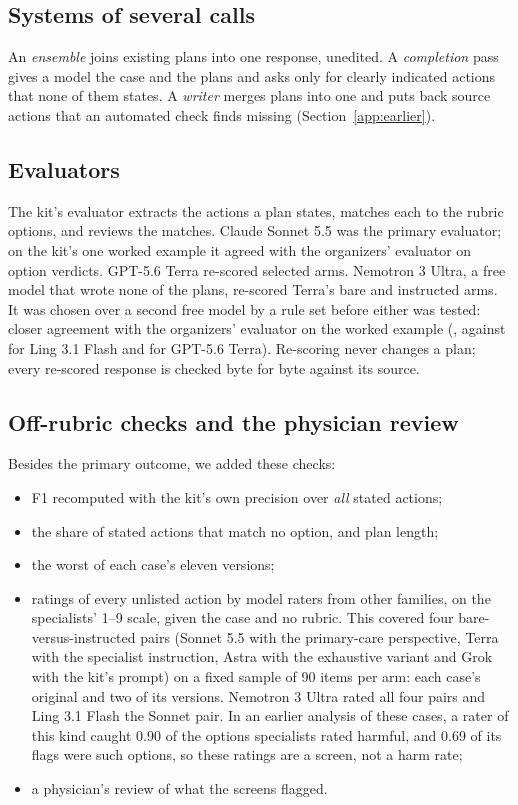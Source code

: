 \documentclass[11pt]{article}
\begin{document}
\subsection{Systems of several calls}
\label{supp:systems}
An \emph{ensemble} joins existing plans into one response, unedited. A \emph{completion} pass gives a
model the case and the plans and asks only for clearly indicated actions that none of them states. A
\emph{writer} merges plans into one and puts back source actions that an automated check finds
missing (Section~\ref{app:earlier}).

\subsection{Evaluators}
\label{supp:evaluators}
The kit's evaluator extracts the actions a plan states, matches each to the rubric options, and
reviews the matches. Claude Sonnet 5.5 was the primary evaluator; on the kit's one worked example it
agreed with the organizers' evaluator on \judgeAgreeSonnet{} option verdicts. GPT-5.6 Terra
re-scored selected arms. Nemotron 3 Ultra, a free model that wrote none of the plans, re-scored
Terra's bare and instructed arms. It was chosen over a second free model by a rule set before either
was tested: closer agreement with the organizers' evaluator on the worked example
(\judgeAgreeNemotron{}, against \judgeAgreeLing{} for Ling 3.1 Flash and \judgeAgreeTerra{} for
GPT-5.6 Terra). Re-scoring never changes a plan; every re-scored response is checked byte for byte
against its source.

\subsection{Off-rubric checks and the physician review}
\label{supp:review}
Besides the primary outcome, we added these checks:
\begin{itemize}
\item F1 recomputed with the kit's own precision over \emph{all} stated actions;
\item the share of stated actions that match no option, and plan length;
\item the worst of each case's eleven versions;
\item ratings of every unlisted action by model raters from other families, on the specialists' 1--9
scale, given the case and no rubric. This covered four bare-versus-instructed pairs (Sonnet 5.5 with
the primary-care perspective, Terra with the specialist instruction, Astra with the exhaustive
variant and Grok with the kit's prompt) on a fixed sample of 90 items per arm: each case's original
and two of its versions. Nemotron 3 Ultra rated all four pairs and Ling 3.1 Flash the Sonnet pair. In
an earlier analysis of these cases, a rater of this kind caught 0.90 of the options specialists rated
harmful, and 0.69 of its flags were such options, so these ratings are a screen, not a harm rate;
\item a physician's review of what the screens flagged.
\end{itemize}
\end{document}
